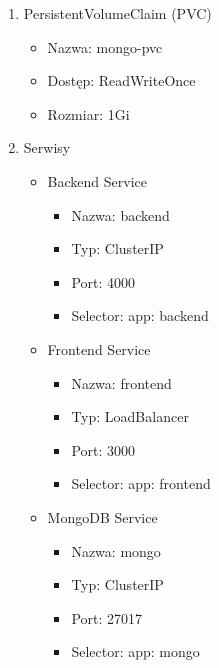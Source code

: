 \documentclass[12pt,a4paper]{article}
\begin{document}
\begin{enumerate}
\begin{itemize}
            \end{itemize}
    \item PersistentVolumeClaim (PVC)
                        \begin{itemize}
                \item Nazwa: mongo-pvc
                \item Dostęp: ReadWriteOnce
                \item Rozmiar: 1Gi

            \end{itemize}
    \item Serwisy
                                  \begin{itemize}
                \item Backend Service
                                            \begin{itemize}
                \item Nazwa: backend
                \item Typ: ClusterIP
                \item Port: 4000
                \item Selector: app: backend

            \end{itemize}
                \item Frontend Service
                       \begin{itemize}
                \item Nazwa: frontend
                \item Typ: LoadBalancer
                \item Port: 3000
                \item Selector: app: frontend

            \end{itemize}
                \item MongoDB Service
                \begin{itemize}
                \item Nazwa: mongo
                \item Typ: ClusterIP
                \item Port: 27017
                \item Selector: app: mongo

            \end{itemize}

            \end{itemize}


\end{enumerate}
\end{document}
